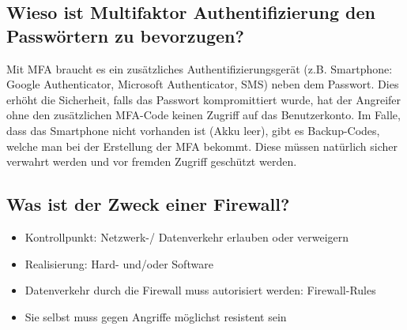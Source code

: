 \subsection*{Wieso ist Multifaktor Authentifizierung den Passwörtern zu bevorzugen?}
Mit MFA braucht es ein zusätzliches Authentifizierungsgerät (z.B. Smartphone: Google Authenticator, Microsoft Authenticator, SMS) neben dem Passwort. Dies erhöht die Sicherheit, falls das Passwort kompromittiert wurde, hat der Angreifer ohne den zusätzlichen MFA-Code keinen Zugriff auf das Benutzerkonto. Im Falle, dass das Smartphone nicht vorhanden ist (Akku leer), gibt es Backup-Codes, welche man bei der Erstellung der MFA bekommt. Diese müssen natürlich sicher verwahrt werden und vor fremden Zugriff geschützt werden.

\subsection*{Was ist der Zweck einer Firewall?}
\begin{itemize}
    \item Kontrollpunkt: Netzwerk-/ Datenverkehr erlauben oder verweigern
    \item Realisierung: Hard- und/oder Software
    \item Datenverkehr durch die Firewall muss autorisiert werden: Firewall-Rules
    \item Sie selbst muss gegen Angriffe möglichst resistent sein
\end{itemize}

